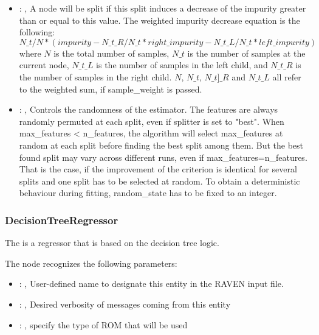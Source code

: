 \begin{itemize}
    \item {}: , 
      A node will be split if this split induces a decrease of the impurity greater than or equal to
      this value.                                                  The weighted impurity decrease
      equation is the following:                                                  $N\_t / N *
      (impurity - N\_t\_R / N\_t * right\_impurity - N\_t\_L / N\_t * left\_impurity)$
      where $N$ is the total number of samples, $N\_t$ is the number of samples at the current node,
      $N\_t\_L$ is the number                                                  of samples in the
      left child, and $N\_t\_R$ is the number of samples in the right child.
      $N$, $N\_t$, $N\_t]\_R$ and $N\_t\_L$ all refer to the weighted sum, if sample\_weight is
      passed.

    \item {}: , 
      Controls the randomness of the estimator. The features are
      always randomly permuted at each split, even if splitter is set to
      "best". When max\_features < n\_features, the algorithm will select
      max\_features at random at each split before finding the best split
      among them. But the best found split may vary across different runs,
      even if max\_features=n\_features. That is the case, if the improvement
      of the criterion is identical for several splits and one split has to
      be selected at random. To obtain a deterministic behaviour during
      fitting, random\_state has to be fixed to an integer.
  \end{itemize}


\subsubsection{DecisionTreeRegressor}
  The  is a regressor that is based on the
  decision tree logic.                          

  The  node recognizes the following parameters:
    \begin{itemize}
      \item {}: , 
        User-defined name to designate this entity in the RAVEN input file.
      \item {}: , 
        Desired verbosity of messages coming from this entity
      \item {}: , 
        specify the type of ROM that will be used
  \end{itemize}

